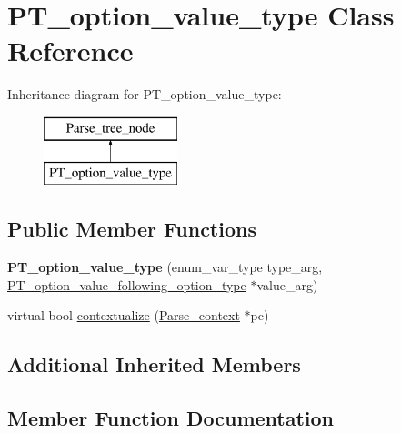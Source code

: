 \hypertarget{classPT__option__value__type}{}\section{P\+T\+\_\+option\+\_\+value\+\_\+type Class Reference}
\label{classPT__option__value__type}
Inheritance diagram for P\+T\+\_\+option\+\_\+value\+\_\+type\+:\begin{figure}[H]
\begin{center}
\leavevmode
\includegraphics[height=2.000000cm]{classPT__option__value__type}
\end{center}
\end{figure}
\subsection*{Public Member Functions}
\begin{DoxyCompactItemize}
\item 
\mbox{\label{classPT__option__value__type_acc80e075e9553447d567c09842778d82}} 
{\bfseries P\+T\+\_\+option\+\_\+value\+\_\+type} (enum\+\_\+var\+\_\+type type\+\_\+arg, \mbox{\hyperlink{classPT__option__value__following__option__type}{P\+T\+\_\+option\+\_\+value\+\_\+following\+\_\+option\+\_\+type}} $\ast$value\+\_\+arg)
\item 
virtual bool \mbox{\hyperlink{classPT__option__value__type_ad23aea78845316211737dd90b3515663}{contextualize}} (\mbox{\hyperlink{structParse__context}{Parse\+\_\+context}} $\ast$pc)
\end{DoxyCompactItemize}
\subsection*{Additional Inherited Members}


\subsection{Member Function Documentation}
\mbox{\label{classPT__option__value__type_ad23aea78845316211737dd90b3515663}} 
